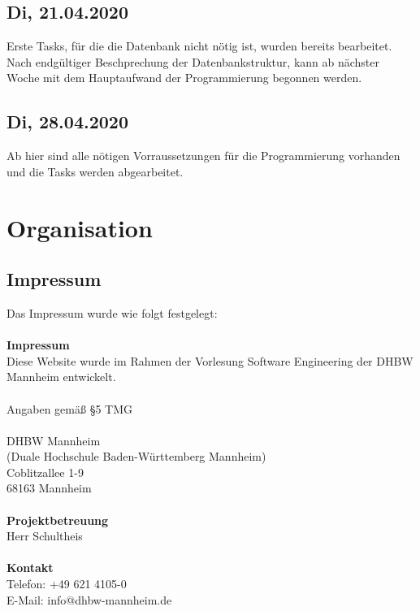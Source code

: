 \subsection{Di, 21.04.2020}
Erste Tasks, für die die Datenbank nicht nötig ist, wurden bereits bearbeitet.
Nach endgültiger Beschprechung der Datenbankstruktur, kann ab nächster Woche mit dem Hauptaufwand der Programmierung begonnen werden.
\subsection{Di, 28.04.2020}
Ab hier sind alle nötigen Vorraussetzungen für die Programmierung vorhanden und die Tasks werden abgearbeitet.
\newpage
\section{Organisation}
\subsection{Impressum}
Das Impressum wurde wie folgt festgelegt:\\\\
\textbf{Impressum}\\
Diese Website wurde im Rahmen der Vorlesung Software Engineering der DHBW Mannheim entwickelt.\\\\
Angaben gemäß §5 TMG\\\\
DHBW Mannheim\\
(Duale Hochschule Baden-Württemberg Mannheim)\\
Coblitzallee 1-9\\
68163 Mannheim\\\\
\textbf{Projektbetreuung}\\
Herr Schultheis\\\\
\textbf{Kontakt}\\
Telefon: +49 621 4105-0\\
E-Mail: info@dhbw-mannheim.de


